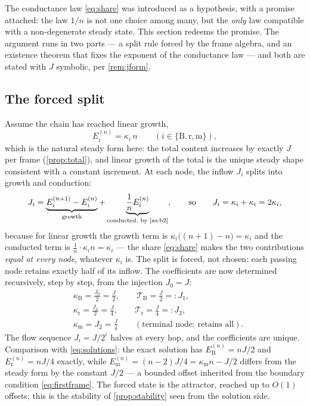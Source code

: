 \documentclass[11pt]{amsbook}
\theoremstyle{plain}
\theoremstyle{definition}
\theoremstyle{remark}
\begin{document}
The conductance law \cref{eq:share} was introduced as a hypothesis, with a promise attached: the law $1/n$ is not one choice among many, but the \emph{only} law compatible with a non-degenerate steady state. This section redeems the promise. The argument runs in two parts --- a split rule forced by the frame algebra, and an existence theorem that fixes the exponent of the conductance law --- and both are stated with $J$ symbolic, per \cref{rem:jform}.

\subsection{The forced split}

Assume the chain has reached linear growth,
\begin{equation}\label{eq:steadystate}
E_{i}^{(n)} = \kappa_{i}\, n \qquad (i \in \{\mathrm B, \mathrm r, \mathrm m\}),
\end{equation}
which is the natural steady form here: the total content increases by exactly $J$ per frame (\cref{prop:total}), and linear growth of the total is the unique steady shape consistent with a constant increment. At each node, the inflow $J_{i}$ splits into growth and conduction:
\begin{equation}\label{eq:nodebalance}
J_{i} = \underbrace{E_{i}^{(n+1)} - E_{i}^{(n)}}_{\text{growth}} + \underbrace{\frac{1}{n} E_{i}^{(n)}}_{\text{conducted, by \cref{as:b2}}},
\qquad\text{so}\qquad
J_{i} = \kappa_{i} + \kappa_{i} = 2\kappa_{i},
\end{equation}
because for linear growth the growth term is $\kappa_{i}\bigl((n+1) - n\bigr) = \kappa_{i}$ and the conducted term is $\tfrac1n\cdot\kappa_{i}n = \kappa_{i}$ --- the share \cref{eq:share} makes the two contributions \emph{equal at every node}, whatever $\kappa_{i}$ is. The split is forced, not chosen: each passing node retains exactly half of its inflow. The coefficients are now determined recursively, step by step, from the injection $J_{0} = J$:
\begin{equation}\label{eq:splitchain}
\begin{aligned}
&\kappa_{\mathrm B} = \frac{J_{0}}{2} = \frac{J}{2}, \qquad \mathcal T_{\mathrm B} = \frac{J}{2} =: J_{1},\\
&\kappa_{\mathrm r} = \frac{J_{1}}{2} = \frac{J}{4}, \qquad \mathcal T_{\mathrm r} = \frac{J}{4} =: J_{2},\\
&\kappa_{\mathrm m} = J_{2} = \frac{J}{4} \qquad (\text{terminal node: retains all}).
\end{aligned}
\end{equation}
The flow sequence $J_{i} = J / 2^{i}$ halves at every hop, and the coefficients are unique. Comparison with \cref{eq:solutions}: the exact solution has $E_{\mathrm B}^{(n)} = nJ/2$ and $E_{\mathrm r}^{(n)} = nJ/4$ exactly, while $E_{\mathrm m}^{(n)} = (n-2)J/4 = \kappa_{\mathrm m}n - J/2$ differs from the steady form by the constant $J/2$ --- a bounded offset inherited from the boundary condition \cref{eq:firstframe}. The forced state is the attractor, reached up to $O(1)$ offsets; this is the stability of \cref{prop:stability} seen from the solution side.
\end{document}
